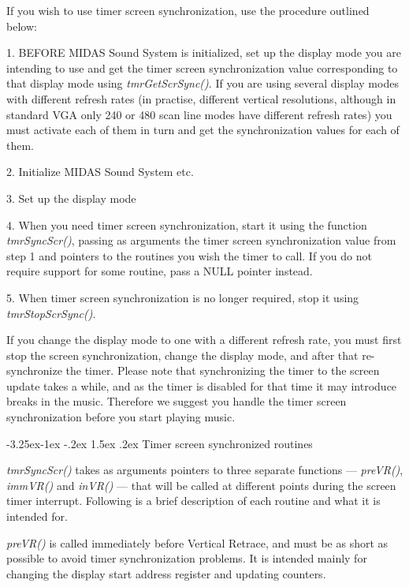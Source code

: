 \documentclass[a4paper,12pt,oneside]{book}
\makeatletter
\renewcommand\subsection{\@startsection{subsection}{2}{-20pt}%
                                     {-3.25ex\@plus -1ex \@minus -.2ex}%
                                     {1.5ex \@plus .2ex}%
                                     {\normalfont\large\bfseries}}
\makeatother
\begin{document}
If you wish to use timer screen synchronization, use the procedure outlined
below:

1. BEFORE MIDAS Sound System is initialized, set up the display mode you are
intending to use and get the timer screen synchronization value corresponding
to that display mode using {\em tmrGetScrSync()}. If you are using several
display modes with different refresh rates (in practise, different vertical
resolutions, although in standard VGA only 240 or 480 scan line modes have
different refresh rates) you must activate each of them in turn and get the
synchronization values for each of them.

2. Initialize MIDAS Sound System etc.

3. Set up the display mode

4. When you need timer screen synchronization, start it using the function
{\em tmrSyncScr()}, passing as arguments the timer screen synchronization
value from step 1 and pointers to the routines you wish the timer to call. If
you do not require support for some routine, pass a NULL pointer instead.

5. When timer screen synchronization is no longer required, stop it using
{\em tmrStopScrSync()}.

If you change the display mode to one with a different refresh rate, you must
first stop the screen synchronization, change the display mode, and after
that re-synchronize the timer. Please note that synchronizing the timer to
the screen update takes a while, and as the timer is disabled for that time
it may introduce breaks in the music. Therefore we suggest you handle the
timer screen synchronization before you start playing music.


\subsection{Timer screen synchronized routines}

{\em tmrSyncScr()} takes as arguments pointers to three separate functions
--- {\em preVR()}, {\em immVR()} and {\em inVR()} --- that will be called
at different points during the screen timer interrupt. Following is a brief
description of each routine and what it is intended for.

{\em preVR()} is called immediately before Vertical Retrace, and must be as
short as possible to avoid timer synchronization problems. It is intended
mainly for changing the display start address register and updating counters.
\end{document}
